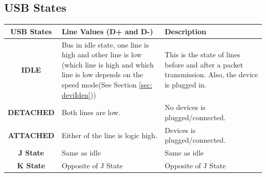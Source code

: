 \documentclass{article}
\begin{document}
\subsection{USB States}
\begin{table}[H]
    \begin{center}
        \begin{tabular}{|c|p{5cm}|p{10cm}|}
            \hline
            \textbf{USB States} & \textbf{Line Values (D+ and D-)}                                                                                                                                & \textbf{Description}                                                                                                                                                \\
            \hline
            \hline
            \textbf{IDLE}       & Bus in idle state, one line is high and other line is low (which line is high and which line is low depends on the speed mode(See Section \ref{sec: deviIden})) & This is the state of lines before and after a packet transmission. Also, the device is plugged in.                                                                  \\
            \hline
            \textbf{DETACHED}   & Both lines are low.                                                                                                                                             & No devices is plugged/connected.                                                                                                                                    \\
            \hline
            \textbf{ATTACHED}   & Either of the line is logic high.                                                                                                                               & Devices is plugged/connected.                                                                                                                                       \\
            \hline
            \textbf{J State}    & Same as idle                                                                                                                                                    & Same as idle                                                                                                                                                        \\
            \hline
            \textbf{K State}    & Opposite of J State                                                                                                                                             & Opposite of J State                                                                                                                                                 \\

\end{tabular}
\end{center}
\end{table}
\end{document}
